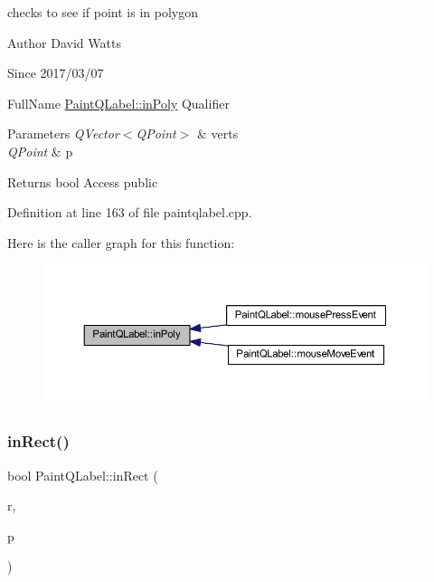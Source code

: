 checks to see if point is in polygon

\begin{DoxyAuthor}{Author}
David Watts 
\end{DoxyAuthor}
\begin{DoxySince}{Since}
2017/03/07
\end{DoxySince}
Full\+Name \hyperlink{class_paint_q_label_af6562b147730457b828f0c776ff001e6}{Paint\+Q\+Label\+::in\+Poly} Qualifier 
\begin{DoxyParams}{Parameters}
{\em Q\+Vector$<$\+Q\+Point$>$} & verts \\
\hline
{\em Q\+Point} & p \\
\hline
\end{DoxyParams}
\begin{DoxyReturn}{Returns}
bool Access public 
\end{DoxyReturn}


Definition at line 163 of file paintqlabel.\+cpp.

Here is the caller graph for this function\+:
\nopagebreak
\begin{figure}[H]
\begin{center}
\leavevmode
\includegraphics[width=350pt]{class_paint_q_label_af6562b147730457b828f0c776ff001e6_icgraph}
\end{center}
\end{figure}
\mbox{\label{class_paint_q_label_aa01fed3a13d42241b4769d14290a85e6}} 
\subsubsection{\texorpdfstring{in\+Rect()}{inRect()}}
{\footnotesize\ttfamily bool Paint\+Q\+Label\+::in\+Rect (\begin{DoxyParamCaption}\item[{Q\+Rect}]{r,  }\item[{Q\+Point}]{p }\end{DoxyParamCaption})}

